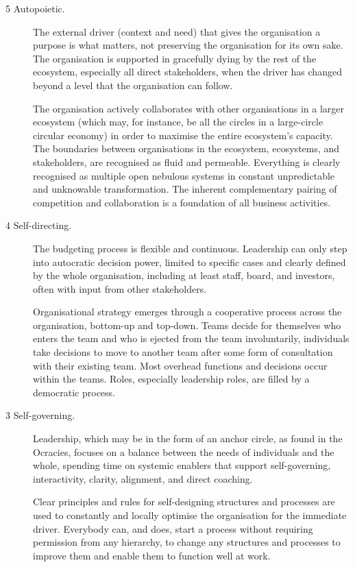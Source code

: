 \begin{description}
\item[5 Autopoietic.]  
The external driver (context and need) that gives the organisation a purpose is what matters, not preserving the organisation for its own sake. The organisation is supported in gracefully dying by the rest of the ecosystem, especially all direct stakeholders, when the driver has changed beyond a level that the organisation can follow. 


The organisation actively collaborates with other organisations in a larger ecosystem  (which may, for instance, be all the circles in a large-circle circular economy) in order to maximise the entire ecosystem’s capacity. The boundaries between organisations in the ecosystem, ecosystems, and stakeholders, are recognised as fluid and permeable. Everything is clearly recognised as multiple open nebulous systems in constant unpredictable and unknowable transformation. The inherent complementary pairing of competition and collaboration is a foundation of all business activities.


\item[4 Self-directing.]  
The budgeting process is flexible and continuous. Leadership can only step into autocratic decision power, limited to specific cases and clearly defined by the whole organisation, including at least staff, board, and investors, often with input from other stakeholders. 


Organisational strategy emerges through a cooperative process across the organisation, bottom-up and top-down. Teams decide for themselves who enters the team and who is ejected from the team involuntarily, individuals take decisions to move to another team after some form of consultation with their existing team. Most overhead functions and decisions occur within the teams. Roles, especially leadership roles, are filled by a democratic process.


\item[3 Self-governing.]  
Leadership, which may be in the form of an anchor circle, as found in the Ocracies, focuses on a balance between the needs of individuals and the whole, spending time on systemic enablers that support self\hyp{}governing, interactivity, clarity, alignment, and direct coaching. 


Clear principles and rules for self-designing structures and processes are used to constantly and locally optimise the organisation for the immediate driver. Everybody can, and does, start a process without requiring permission from any hierarchy, to change any structures and processes to improve them and enable them to function well at work.



\end{description}
